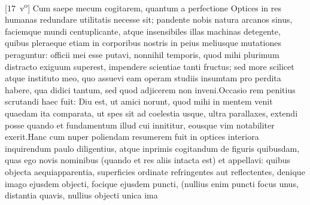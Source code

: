 [17~v\textsuperscript{o}] Cum saepe mecum cogitarem, quantum a perfectione Optices in res humanas redundare utilitatis necesse sit; pandente nobis natura arcanos sinus, faciemque mundi centuplicante, atque insensibiles illas machinas detegente, quibus pleraeque etiam in corporibus nostris in peius meliusque mutationes peraguntur: officii mei esse putavi, nonnihil temporis, quod mihi plurimum distracto exiguum superest, impendere scientiae tanti fructus; sed more scilicet atque instituto meo, quo assuevi eam operam studiis insumtam pro perdita habere, qua didici tantum, sed quod adjicerem non inveni.\pend \pstart  Occasio rem penitius scrutandi haec fuit: Diu est, ut amici norunt, quod mihi in mentem venit  quaedam  ita comparata, ut spes sit ad coelestia usque, ultra parallaxes\protect{}, extendi posse quando et fundamentum illud cui innititur, eousque vim notabiliter exerit.\pend \pstart  Hanc cum nuper poliendam resumerem fuit in optices interiora inquirendum paulo diligentius, atque inprimis cogitandum de figuris quibusdam, quas ego novis nominibus (quando et res aliis intacta est) \protect{}\textso{, }\protect{} et \protect{} appellavi: quibus objecta aequiapparentia, superficies ordinate refringentes aut reflectentes, denique imago ejusdem objecti, focique\protect{} ejusdem puncti, (nullius enim puncti focus\protect{} unus, distantia quavis, nullius objecti unica ima~